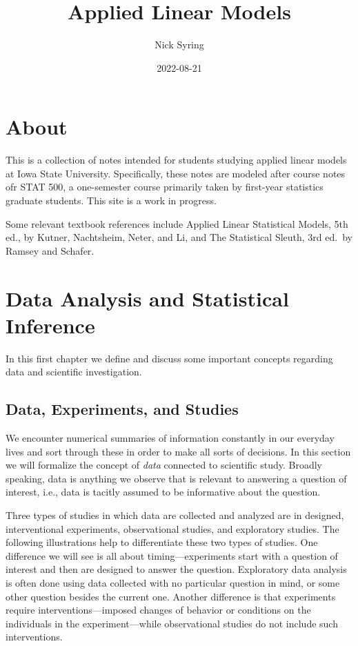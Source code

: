 \documentclass[
]{book}
\title{Applied Linear Models}
\author{Nick Syring}
\date{2022-08-21}
\begin{document}
\maketitle

{
\setcounter{tocdepth}{1}
\tableofcontents
}
\hypertarget{about}{%
\chapter{About}\label{about}}

This is a collection of notes intended for students studying applied linear models at Iowa State University. Specifically, these notes are modeled after course notes ofr STAT 500, a one-semester course primarily taken by first-year statistics graduate students. This site is a work in progress.

Some relevant textbook references include Applied Linear Statistical Models, 5th ed., by Kutner, Nachtsheim, Neter, and Li, and The Statistical Sleuth, 3rd ed.~by Ramsey and Schafer.

\hypertarget{data-analysis-and-statistical-inference}{%
\chapter{Data Analysis and Statistical Inference}\label{data-analysis-and-statistical-inference}}

In this first chapter we define and discuss some important concepts regarding data and scientific investigation.

\hypertarget{data-experiments-and-studies}{%
\section{Data, Experiments, and Studies}\label{data-experiments-and-studies}}

We encounter numerical summaries of information constantly in our everyday lives and sort through these in order to make all sorts of decisions. In this section we will formalize the concept of \emph{data} connected to scientific study. Broadly speaking, data is anything we observe that is relevant to answering a question of interest, i.e., data is tacitly assumed to be informative about the question.

Three types of studies in which data are collected and analyzed are in designed, interventional experiments, observational studies, and exploratory studies. The following illustrations help to differentiate these two types of studies. One difference we will see is all about timing---experiments start with a question of interest and then are designed to answer the question. Exploratory data analysis is often done using data collected with no particular question in mind, or some other question besides the current one. Another difference is that experiments require interventions---imposed changes of behavior or conditions on the individuals in the experiment---while observational studies do not include such interventions.
\end{document}

